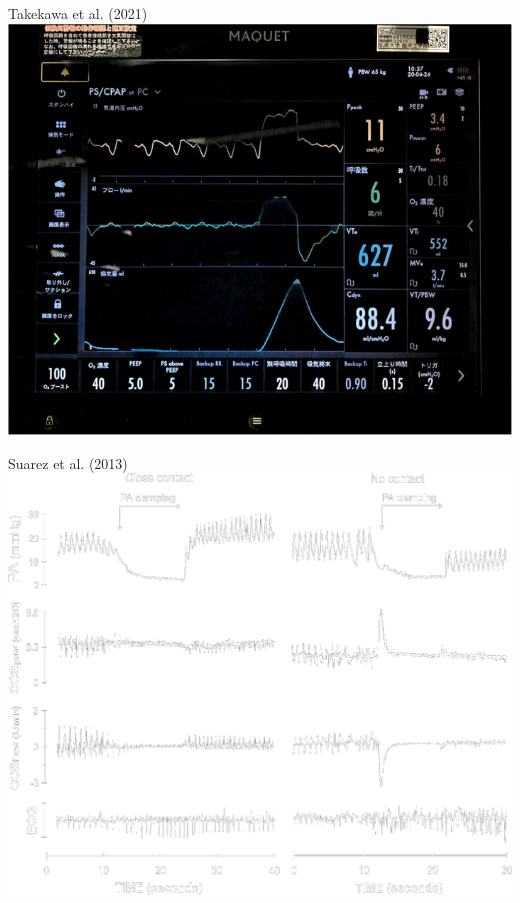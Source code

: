 \begin{frame}{Takekawa et al. (2021)}
	\centering
	\includegraphics[clip, trim=20 5 22 25]{captures/Takekawa2021-3}
\end{frame}




\begin{frame}{Suarez et al. (2013)}
	\centering
	\includegraphics[height=0.85\textheight]{captures/Suarez2013-transparent}
\end{frame}
